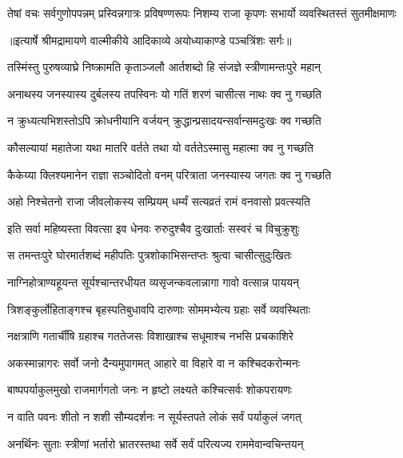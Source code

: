 \fourlineindentedshloka
{तेषां वचः सर्वगुणोपपन्नम्}
{प्रस्विन्नगात्रः प्रविषण्णरूपः}
{निशम्य राजा कृपणः सभार्यो}
{व्यवस्थितस्तं सुतमीक्षमाणः} %


{॥इत्यार्षे श्रीमद्रामायणे वाल्मीकीये आदिकाव्ये अयोध्याकाण्डे पञ्चत्रिंशः सर्गः॥}


\twolineshloka
{तस्मिंस्तु पुरुषव्याघ्रे निष्क्रामति कृताञ्जलौ}
{आर्तशब्दो हि संजज्ञे स्त्रीणामन्तःपुरे महान्} %

\twolineshloka
{अनाथस्य जनस्यास्य दुर्बलस्य तपस्विनः}
{यो गतिं शरणं चासीत्स नाथः क्व नु गच्छति} %

\twolineshloka
{न क्रुध्यत्यभिशस्तोऽपि क्रोधनीयानि वर्जयन्}
{क्रुद्धान्प्रसादयन्सर्वान्समदुःखः क्व गच्छति} %

\twolineshloka
{कौसल्यायां महातेजा यथा मातरि वर्तते}
{तथा यो वर्ततेऽस्मासु महात्मा क्व नु गच्छति} %

\twolineshloka
{कैकेय्या क्लिश्यमानेन राज्ञा सञ्चोदितो वनम्}
{परित्राता जनस्यास्य जगतः क्व नु गच्छति} %

\twolineshloka
{अहो निश्चेतनो राजा जीवलोकस्य सम्प्रियम्}
{धर्म्यं सत्यव्रतं रामं वनवासो प्रवत्स्यति} %

\twolineshloka
{इति सर्वा महिष्यस्ता विवत्सा इव धेनवः}
{रुरुदुश्चैव दुःखार्ताः सस्वरं च विचुक्रुशुः} %

\twolineshloka
{स तमन्तःपुरे घोरमार्तशब्दं महीपतिः}
{पुत्रशोकाभिसन्तप्तः श्रुत्वा चासीत्सुदुःखितः} %

\twolineshloka
{नाग्निहोत्राण्यहूयन्त सूर्यश्चान्तरधीयत}
{व्यसृजन्कवलान्नागा गावो वत्सान्न पाययन्} %

\twolineshloka
{त्रिशङ्कुर्लोहिताङ्गश्च बृहस्पतिबुधावपि}
{दारुणाः सोममभ्येत्य ग्रहाः सर्वे व्यवस्थिताः} %

\twolineshloka
{नक्षत्राणि गतार्चींषि ग्रहाश्च गततेजसः}
{विशाखाश्च सधूमाश्च नभसि प्रचकाशिरे} %

\twolineshloka
{अकस्मान्नागरः सर्वो जनो दैन्यमुपागमत्}
{आहारे वा विहारे वा न कश्चिदकरोन्मनः} %

\twolineshloka
{बाष्पपर्याकुलमुखो राजमार्गगतो जनः}
{न हृष्टो लक्ष्यते कश्चित्सर्वः शोकपरायणः} %

\twolineshloka
{न वाति पवनः शीतो न शशी सौम्यदर्शनः}
{न सूर्यस्तपते लोकं सर्वं पर्याकुलं जगत्} %

\twolineshloka
{अनर्थिनः सुताः स्त्रीणां भर्तारो भ्रातरस्तथा}
{सर्वे सर्वं परित्यज्य राममेवान्वचिन्तयन्} %

